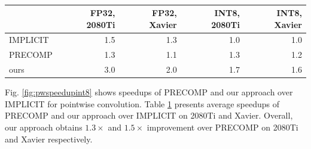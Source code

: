 \begin{table}[]
\setlength{\tabcolsep}{2.5pt}
\caption{}
\vspace{-3mm}
\label{tab:pwspeedups}
\centering
{}
\begin{threeparttable}
\begin{tabular}{lrrrr}
\toprule
& FP32, 2080Ti & FP32, Xavier &INT8, 2080Ti&INT8, Xavier\\
\midrule
IMPLICIT & 1.5 & 1.3 & 1.0 & 1.0\\
PRECOMP  & 1.3 & 1.1 & 1.3 & 1.2\\
ours     & 3.0 & 2.0 & 1.7 & 1.6\\
\bottomrule
\end{tabular}
\end{threeparttable}
\end{table}



  Fig. \ref{fig:pwspeedupint8} shows speedups of PRECOMP and our approach over IMPLICIT for
pointwise convolution. Table \ref{tab:pwspeedups} presents average speedups of PRECOMP and our approach over IMPLICIT on 2080Ti and Xavier. Overall, our approach obtains $1.3\times$ and $1.5\times$ improvement over PRECOMP on 2080Ti and Xavier respectively.


